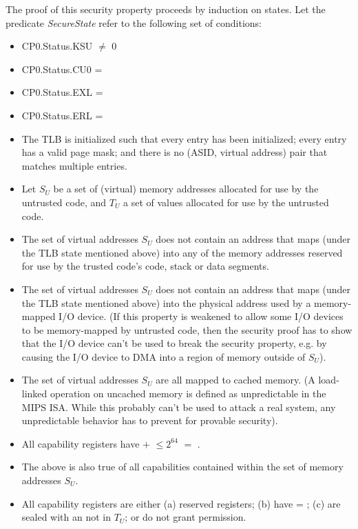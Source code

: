 The proof of this security property proceeds by induction on states. Let the
predicate \emph{SecureState} refer to the following set of conditions:

\begin{itemize}
\item
CP0.Status.KSU $\neq$ 0
\item
CP0.Status.CU0 = \algorithmicfalse{}
\item
CP0.Status.EXL = \algorithmicfalse{}
\item
CP0.Status.ERL = \algorithmicfalse{}
\item
The TLB is initialized such that every entry has been initialized; every entry has
a valid page mask; and there is no (ASID, virtual address) pair that matches multiple
entries.
\item
Let $S_U$ be a set of (virtual) memory addresses allocated for use by the untrusted code,
and $T_U$ a set of \cotype{} values allocated for use by the untrusted code.
\item
The set of virtual addresses $S_U$ does not contain an address that maps (under the
TLB state mentioned above) into any of the memory addresses reserved for use
by the trusted code's code, stack or data segments.
\item
The set of virtual addresses $S_U$ does not contain an address that maps (under the
TLB state mentioned above) into the physical address used by a memory-mapped I/O
device. (If this property is weakened to allow some I/O devices to be memory-mapped
by untrusted code, then the security proof has to show that the I/O device can't
be used to break the security property, e.g. by causing the I/O device to DMA
into a region of memory outside of $S_U$).
\item
The set of virtual addresses $S_U$ are all mapped to cached memory. (A load-linked
operation on uncached memory is defined as unpredictable in the MIPS ISA. While
this probably can't be used to attack a real system, any unpredictable behavior
has to prevent for provable security).
\item
All capability registers have \cbase{} $+$ \clength{} $\leq 2^{64}$
\algorithmicor{} \ctag{} $=$ \algorithmicfalse{}.
\item
The above is also true of all capabilities contained within the set of memory
addresses $S_U$.
\item
All capability registers are either (a) reserved registers; (b) have \ctag{} =
\algorithmicfalse{}; (c) are sealed with an \cotype{} not in $T_U$; or do not
grant \cappermASR* permission.

\end{itemize}
